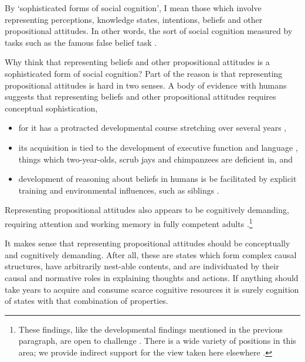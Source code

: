 \documentclass[12pt,a4paper]{extarticle}
\begin{document}
By `sophisticated forms of social cognition', I mean those which involve representing perceptions, knowledge states, intentions, beliefs and other propositional attitudes.
In other words, the sort of social cognition measured by tasks such as the famous false belief task \citep{Wimmer:1983dz}.

Why think that representing beliefs and other propositional attitudes is a sophisticated form of social cognition?
Part of the reason is that representing propositional attitudes is hard in two senses.  
A body of evidence with humans suggests that representing  beliefs and other propositional attitudes requires conceptual sophistication, 
%
\begin{itemize}
\item for it has a protracted developmental course stretching over several years \citep{Wimmer:1983dz,Wellman:2001lz}, 
\item its acquisition is tied to the development of executive function \citep{Perner:1999yr,Sabbagh:2006ke} and language \citep{Astington2005ot}, things which two-year-olds, scrub jays and chimpanzees are deficient in, and   
\item development of reasoning about beliefs in humans is be facilitated by explicit training \citep{Slaughter:1996fv} and environmental influences, such as siblings \citep{Clements:2000nc,Hughes:2004zj}.  
\end{itemize}
%
Representing propositional attitudes also appears to be cognitively demanding, requiring attention and working memory in fully competent adults \citep{Apperly:2008jv,Apperly:2009cc,McKinnon:2007rr}.\footnote{
These findings, like the developmental findings mentioned in the previous paragraph, are open to challenge \citep[e.g.][]{Leslie:2005ef}.  
There is a wide variety of positions in this area; we provide indirect support for the view taken here elsewhere \citep{Apperly:2009ju,butterfill_minimal}.
}

It makes sense that representing propositional attitudes should be conceptually and cognitively demanding.  
After all, these are states which form complex causal structures, have arbitrarily nest-able contents, and are individuated by their causal and normative roles in explaining thoughts and actions.  
If anything should take years to acquire and consume scarce cognitive resources it is surely cognition of states with that combination of properties.

\end{document}
